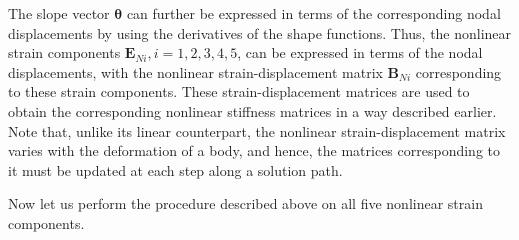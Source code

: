 The slope vector $\boldsymbol{\theta}$ can further be expressed in terms of the corresponding nodal displacements by using the derivatives of the shape functions. Thus, the nonlinear strain components $\mathbf{E}_{Ni}, i=1, 2, 3, 4, 5$, can be expressed in terms of the nodal displacements, with the nonlinear strain-displacement matrix $\mathbf{B}_{Ni}$ corresponding to these strain components. These strain-displacement matrices are used to obtain the corresponding nonlinear stiffness matrices in a way described earlier.  Note that, unlike its linear counterpart, the nonlinear strain-displacement matrix varies with the deformation of a body, and hence, the matrices corresponding to it must be updated at each step along a solution path.

Now let us perform the procedure described above on all five nonlinear strain components.

